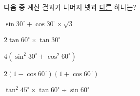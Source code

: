 다음 중 계산 결과가 나머지 넷과 \underline{다른} 하나는?
\begin{choicesv}{\rule[-3ex]{0pt}{8ex}$\sin 30^\circ+\cos 30^\circ\times\sqrt{3}$}{\rule[-3ex]{0pt}{8ex}$2\tan 60^\circ\times\tan 30^\circ$}{\rule[-3ex]{0pt}{8ex}$4(\sin^2 30^\circ+\cos^2 60^\circ)$}{\rule[-3ex]{0pt}{8ex}$2(1-\cos 60^\circ)(1+\cos 60^\circ)$}{\rule[-3ex]{0pt}{8ex}$\tan^2 45^\circ\times\tan 60^\circ\div\sin 60^\circ$}\end{choicesv}
